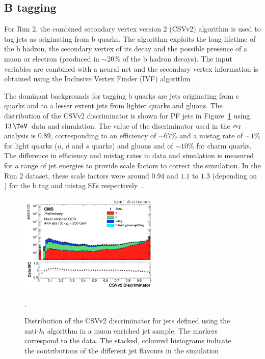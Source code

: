 \subsection{B tagging}
\label{sec:btag}
For Run 2, the combined secondary vertex version 2 (CSVv2) algorithm is used to tag jets as originating
from b quarks. The algorithm exploits the long lifetime of the b hadron, the secondary vertex of its decay
and the possible presence of a muon or electron (produced in $\sim 20\%$ of the b hadron decays). The 
input variables are combined with a neural net and the secondary vertex
information is obtained using the Inclusive Vertex Finder (IVF) algorithm~\cite{csv_pas}.

The dominant backgrounds for tagging b quarks are jets originating from c quarks and to a lesser extent
jets from lighter quarks and gluons. The distribution of the CSVv2 discriminator is shown for PF jets
in Figure~\ref{fig:csv_fig} using $13\,\TeV$~data and simulation. The value of the discriminator
used in the $\alpha_{\text{T}}$ analysis is 0.89, corresponding to an efficiency of $\sim67\%$ and 
a mistag rate of $\sim 1\%$ for light quarks ($u$, $d$ and $s$ quarks) and gluons and of $\sim 10\%$ for
charm quarks. The difference in efficiency and mistag rates in data and simulation is measured 
for a range of jet energies to provide scale factors to correct the simulation. In the
Run 2 dataset, these scale factors were around $0.94$ and $1.1$ to $1.3$ (depending on \pt) for the b tag and mistag SFs 
respectively~\cite{csv_fig}.

\begin{figure}
\centering
    \includegraphics[width=0.6\textwidth]{./Figures/reconstruction/csv_fig.png}
  \caption{\label{fig:csv_fig} Distribution of the CSVv2 discriminator for jets 
  defined using the anti-$k_t$ algorithm in a muon enriched jet sample. The markers correspond to the data. 
The stacked, coloured histograms indicate the contributions of the different 
jet flavours in the simulation~\cite{csv_fig}}.
\end{figure}
%
%
%
